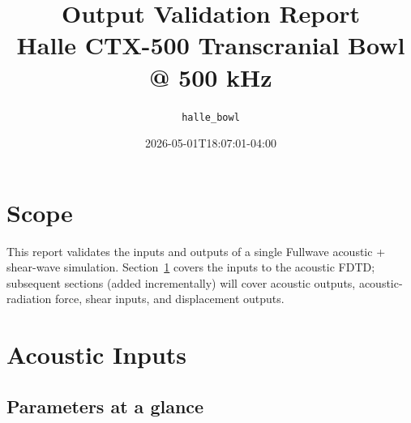 \documentclass[11pt,letterpaper]{article}
\title{Output Validation Report\\\large Halle CTX-500 Transcranial Bowl @ 500 kHz}
\author{\texttt{halle\_bowl}}
\date{2026-05-01T18:07:01-04:00}
\begin{document}
\maketitle
\thispagestyle{fancy}

\section*{Scope}
This report validates the inputs and outputs of a single Fullwave acoustic +
shear-wave simulation. Section~\ref{sec:acoustic_inputs} covers the inputs to
the acoustic FDTD; subsequent sections (added incrementally) will cover
acoustic outputs, acoustic-radiation force, shear inputs, and displacement
outputs.

\section{Acoustic Inputs}\label{sec:acoustic_inputs}

\subsection{Parameters at a glance}\label{sec:params_compact}
\end{document}

